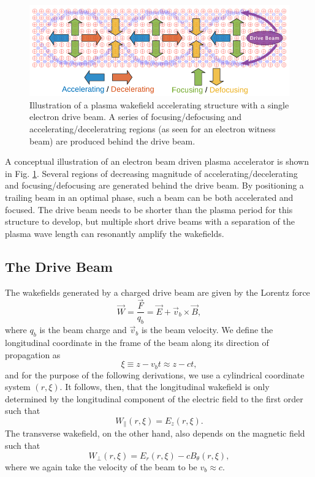 \begin{figure}[hbt]
    \centering
    \includegraphics[width=0.85\linewidth,trim={0mm 0mm 0mm 0mm},clip]{figures/PlasmaWakefield}
    \caption{\label{Fig:PWFA:Illust} Illustration of a plasma wakefield accelerating structure with a single electron drive beam. A series of focusing/defocusing and accelerating/deceleratring regions (as seen for an electron witness beam) are produced behind the drive beam.}
\end{figure}

A conceptual illustration of an electron beam driven plasma accelerator is shown in Fig. \ref{Fig:PWFA:Illust}. Several regions of decreasing magnitude of accelerating/decelerating and focusing/defocusing are generated behind the drive beam. By positioning a trailing beam in an optimal phase, such a beam can be both accelerated and focused. The drive beam needs to be shorter than the plasma period for this structure to develop, but multiple short drive beams with a separation of the plasma wave length can resonantly amplify the wakefields.

\subsection{The Drive Beam}
\label{Int:BPI:Drive}

The wakefields generated by a charged drive beam are given by the Lorentz force
\begin{equation}
    \vec{W} = \frac{\vec{F}}{q_{b}} = \vec{E} + \vec{v}_{b} \times \vec{B}, \label{EQ:Lorentz}
\end{equation}
where $q_{b}$ is the beam charge and $\vec{v}_{b}$ is the beam velocity. We define the longitudinal coordinate in the frame of the beam along its direction of propagation as
\begin{equation}
    \xi \equiv z - v_{b}t \approx z - ct, \label{EQ:Xi}
\end{equation}
and for the purpose of the following derivations, we use a cylindrical coordinate system $(r, \xi)$. It follows, then, that the longitudinal wakefield is only determined by the longitudinal component of the electric field \dash to the first order \dash such that
\begin{equation}
    W_{\parallel}(r,\xi) = E_{z}(r,\xi). \label{EQ:Wz}
\end{equation}
The transverse wakefield, on the other hand, also depends on the magnetic field such that
\begin{equation}
    W_{\perp}(r,\xi) = E_{r}(r,\xi) - cB_{\theta}(r,\xi), \label{EQ:Wr}
\end{equation}
where we again take the velocity of the beam to be $v_{b} \approx c$.


